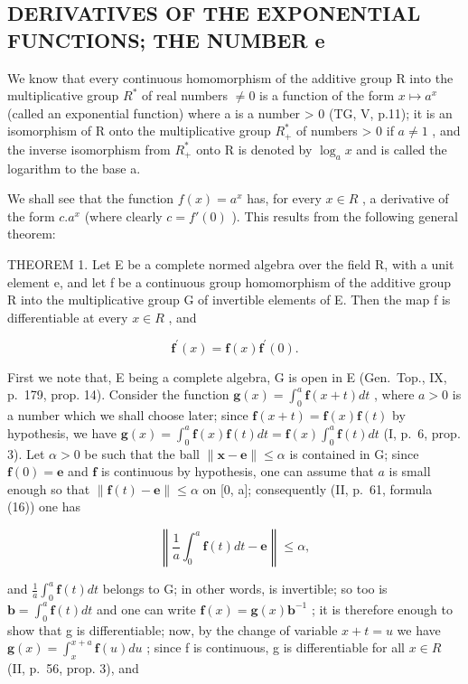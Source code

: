 \subsection{DERIVATIVES OF THE EXPONENTIAL FUNCTIONS; THE NUMBER e}

We know that every continuous homomorphism of the additive group R into the multiplicative group \(R^{*}\) of real numbers \(\neq 0\) is a function of the form \(x \mapsto a^{x}\) (called an exponential function) where a is a number \textgreater{} 0 (TG, V, p.11); it is an isomorphism of R onto the multiplicative group \(R_{+}^{*}\) of numbers \textgreater{} 0 if \(a \neq 1\) , and the inverse isomorphism from \(R_{+}^{*}\) onto R is denoted by \(\log_{a} x\) and is called the logarithm to the base a.

We shall see that the function \(f(x) = a^{x}\) has, for every \(x \in R\) , a derivative of the form \(c.a^{x}\) (where clearly \(c = f'(0)\) ). This results from the following general theorem:

THEOREM 1. Let E be a complete normed algebra over the field R, with a unit element e, and let f be a continuous group homomorphism of the additive group R into the multiplicative group G of invertible elements of E. Then the map f is differentiable at every \(x \in R\) , and

\[
\mathbf {f} ^ {\prime} (x) = \mathbf {f} (x) \mathbf {f} ^ {\prime} (0).\tag{1}
\]

First we note that, E being a complete algebra, G is open in E (Gen.~Top., IX, p.~179, prop. 14). Consider the function \(\mathbf{g}(x) = \int_0^a \mathbf{f}(x + t) dt\) , where \(a > 0\) is a number which we shall choose later; since \(\mathbf{f}(x + t) = \mathbf{f}(x) \mathbf{f}(t)\) by hypothesis, we have \(\mathbf{g}(x) = \int_0^a \mathbf{f}(x) \mathbf{f}(t) dt = \mathbf{f}(x) \int_0^a \mathbf{f}(t) dt\) (I, p.~6, prop. 3). Let \(\alpha > 0\) be such that the ball \(\| \mathbf{x} - \mathbf{e} \| \leqslant \alpha\) is contained in G; since \(\mathbf{f}(0) = \mathbf{e}\) and \(\mathbf{f}\) is continuous by hypothesis, one can assume that \(a\) is small enough so that \(\| \mathbf{f}(t) - \mathbf{e} \| \leqslant \alpha\) on {[}0, a{]}; consequently (II, p.~61, formula (16)) one has

\[
\left\| \frac {1}{a} \int_ {0} ^ {a} \mathbf {f} (t) d t - \mathbf {e} \right\| \leqslant \alpha ,
\]

and \(\frac{1}{a}\int_{0}^{a}\mathbf{f}(t)dt\) belongs to G; in other words, is invertible; so too is \(\mathbf{b}=\int_{0}^{a}\mathbf{f}(t)dt\) and one can write \(\mathbf{f}(x)=\mathbf{g}(x)\mathbf{b}^{-1}\) ; it is therefore enough to show that g is differentiable; now, by the change of variable \(x+t=u\) we have \(\mathbf{g}(x)=\int_{x}^{x+a}\mathbf{f}(u)du\) ; since f is continuous, g is differentiable for all \(x\in R\) (II, p.~56, prop. 3), and

